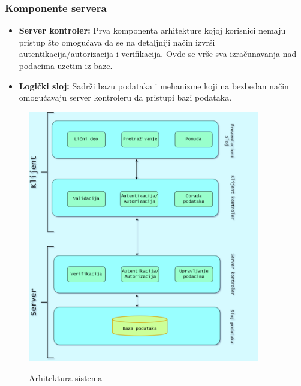 \documentclass[20pt]{article}
\begin{document}
            
\subsubsection{\bfseries \Large Komponente servera }
\setlength{\parindent}{1cm}
\fontsize{13}{18} \selectfont       
\begin{itemize}
    \item \textbf{Server kontroler:} Prva komponenta arhitekture kojoj korisnici nemaju pristup \v {s}to omogu\' cava da se na detaljniji na\v {c}in izvr\v {s}i autentikacija/autorizacija i verifikacija. Ovde se vr\v {s}e sva izra\v {c}unavanja nad podacima uzetim iz baze.
    \item \textbf{Logi\v {c}ki sloj:} Sadr\v {z}i bazu podataka i mehanizme koji na bezbedan na\v {c}in omogu\' cavaju server kontroleru da pristupi bazi podataka.
\end{itemize}

\newpage
\begin{figure}[h]
        \centering
        \includegraphics[width=0.9\textwidth,height=0.74\textheight]{Pictures/Arhitektura3.png}\\
        \caption{Arhitektura sistema}
        \label{fig:arhitekturaSistema}
\end{figure}

      
\end{document}
